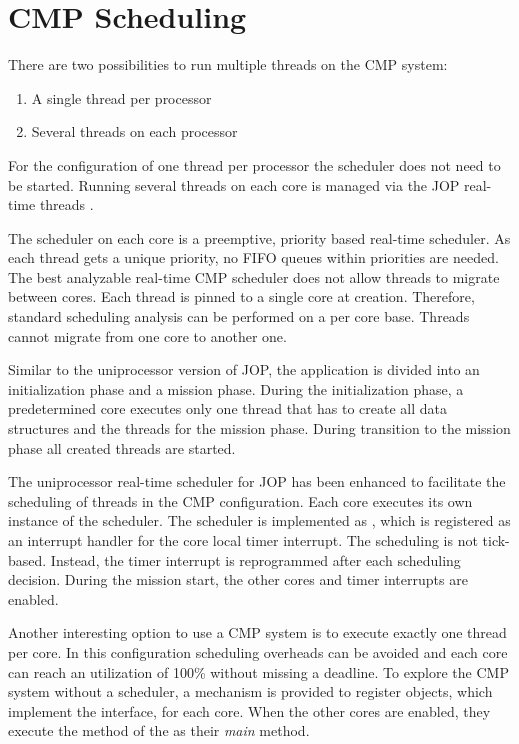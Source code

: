 \section{CMP Scheduling}


There are two possibilities to run multiple threads on the CMP
system:

\begin{enumerate}
  \item A single thread per processor
  \item Several threads on each processor
\end{enumerate}

For the configuration of one thread per processor the scheduler does
not need to be started. Running several threads on each core is
managed via the JOP real-time threads .

The scheduler on each core is a preemptive, priority based real-time
scheduler. As each thread gets a unique priority, no FIFO queues
within priorities are needed. The best analyzable real-time CMP
scheduler does not allow threads to migrate between cores. Each
thread is pinned to a single core at creation. Therefore, standard
scheduling analysis can be performed on a per core base. Threads
cannot migrate from one core to another one.

Similar to the uniprocessor version of JOP, the application is
divided into an initialization phase and a mission phase. During the
initialization phase, a predetermined core executes only one thread
that has to create all data structures and the threads for the
mission phase. During transition to the mission phase all created
threads are started.

The uniprocessor real-time scheduler for JOP has been enhanced to
facilitate the scheduling of threads in the CMP configuration. Each
core executes its own instance of the scheduler. The scheduler is
implemented as , which is registered as an interrupt
handler for the core local timer interrupt. The scheduling is not
tick-based. Instead, the timer interrupt is reprogrammed after each
scheduling decision. During the mission start, the other cores and
timer interrupts are enabled.

Another interesting option to use a CMP system is to execute exactly
one thread per core. In this configuration scheduling overheads can
be avoided and each core can reach an utilization of 100\% without
missing a deadline. To explore the CMP system without a scheduler, a
mechanism is provided to register objects, which implement the
 interface, for each core. When the other cores are
enabled, they execute the  method of the  as
their \emph{main} method.

